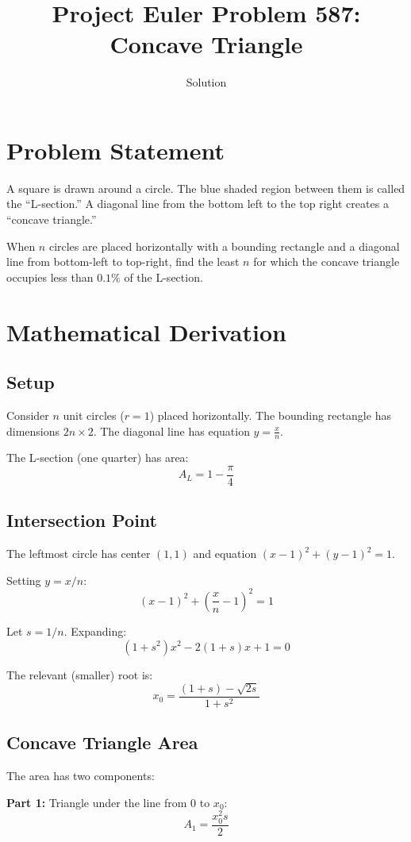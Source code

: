 \documentclass[12pt]{article}
\title{Project Euler Problem 587: Concave Triangle}
\author{Solution}
\date{}
\begin{document}
\maketitle

\section{Problem Statement}

A square is drawn around a circle. The blue shaded region between them is called the ``L-section.'' A diagonal line from the bottom left to the top right creates a ``concave triangle.''

When $n$ circles are placed horizontally with a bounding rectangle and a diagonal line from bottom-left to top-right, find the least $n$ for which the concave triangle occupies less than $0.1\%$ of the L-section.

\section{Mathematical Derivation}

\subsection{Setup}
Consider $n$ unit circles ($r = 1$) placed horizontally. The bounding rectangle has dimensions $2n \times 2$. The diagonal line has equation $y = \frac{x}{n}$.

The L-section (one quarter) has area:
\[
A_L = 1 - \frac{\pi}{4}
\]

\subsection{Intersection Point}
The leftmost circle has center $(1, 1)$ and equation $(x-1)^2 + (y-1)^2 = 1$.

Setting $y = x/n$:
\[
(x - 1)^2 + \left(\frac{x}{n} - 1\right)^2 = 1
\]

Let $s = 1/n$. Expanding:
\[
(1 + s^2)x^2 - 2(1 + s)x + 1 = 0
\]

The relevant (smaller) root is:
\[
x_0 = \frac{(1+s) - \sqrt{2s}}{1+s^2}
\]

\subsection{Concave Triangle Area}
The area has two components:

\textbf{Part 1:} Triangle under the line from $0$ to $x_0$:
\[
A_1 = \frac{x_0^2 s}{2}
\]
\end{document}
